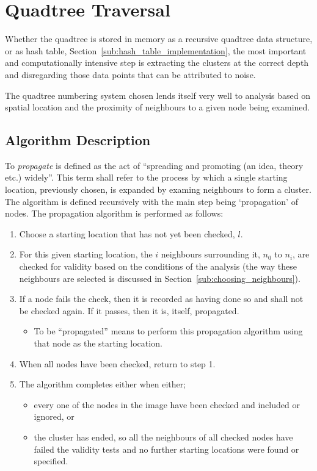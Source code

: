 
\section{Quadtree Traversal}
\label{sec:quadtree_traversal}

Whether the quadtree is stored in memory as a recursive quadtree data
structure, or as hash table, Section~\ref{sub:hash_table_implementation}, the
most important and computationally intensive step is extracting the clusters at
the correct depth and disregarding those data points that can be attributed to
noise.

The quadtree numbering system chosen lends itself very well to analysis based
on spatial location and the proximity of neighbours to a given node being
examined.

\subsection{Algorithm Description}
\label{sub:algorithm_description}

To \emph{propagate} is defined as the act of ``spreading and promoting (an
idea, theory etc.) widely''\cite{oed31}. This term shall refer to the process
by which a single starting location, previously chosen, is expanded by examing
neighbours to form a cluster. The algorithm is defined recursively with the
main step being `propagation' of nodes. The propagation algorithm is performed
as follows:

\begin{enumerate}
	\item Choose a starting location that has not yet been checked, $l$.
	\item For this given starting location, the $i$ neighbours surrounding it,
		$n_0$ to $n_i$, are checked for validity based on the conditions of the
		analysis (the way these neighbours are selected is discussed in
		Section~\ref{sub:choosing_neighbours}).
	\item If a node fails the check, then it is recorded as having done so and
		shall not be checked again. If it passes, then it is, itself,
		propagated.
		\begin{itemize}
			\item To be ``propagated'' means to perform this propagation
				algorithm using that node as the starting location.
		\end{itemize}
	\item When all nodes have been checked, return to step 1.
	\item The algorithm completes either when either;
	\begin{itemize}
		\item every one of the nodes in the image have been checked and
			included or ignored, or
		\item the cluster has ended, so all the neighbours of all checked nodes
			have failed the validity tests and no further starting locations
			were found or specified.
	\end{itemize}
\end{enumerate}

